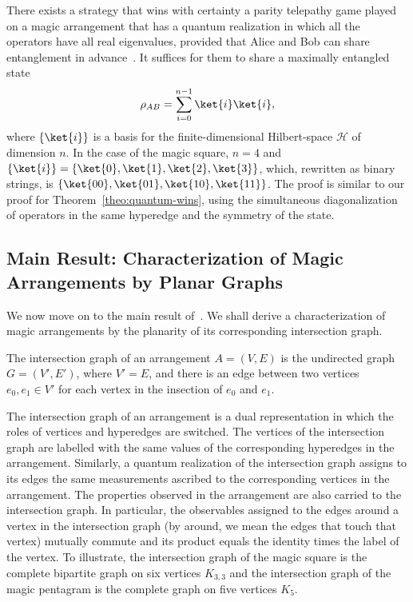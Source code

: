 \documentclass{llncs}
\begin{document}
There exists a strategy that wins with certainty a parity telepathy
game played on a magic arrangement that has a quantum realization in
which all the operators have all real eigenvalues, provided that Alice
and Bob can share entanglement in advance~\cite[Theorem
17]{arkhipov2012}. It suffices for them to share a maximally entangled
state
\[
  \rho_{AB} = \sum_{i = 0}^{n-1} \ket{i}\ket{i},
\]
where \(\{\ket{i}\}\) is a basis for the finite-dimensional
Hilbert-space \(\mathcal{H}\) of dimension \(n\). In the case of the
magic square, \(n = 4\) and
\(\{\ket{i}\} = \{\ket{0}, \ket{1}, \ket{2}, \ket{3}\}\), which,
rewritten as binary strings, is
\(\{\ket{00}, \ket{01}, \ket{10}, \ket{11}\}\). The proof is similar
to our proof for Theorem~\ref{theo:quantum-wins}, using the
simultaneous diagonalization of operators in the same hyperedge and
the symmetry of the state.

\subsection{Main Result: Characterization of Magic Arrangements by Planar Graphs}

We now move on to the main result of~\cite{arkhipov2012}. We shall
derive a characterization of magic arrangements by the planarity of
its corresponding intersection graph.

\begin{definition}\label{def:intersec}
  The intersection graph of an arrangement \(A = (V, E)\) is the
  undirected graph \(G = (V', E')\), where \(V' = E\), and there is an
  edge between two vertices \(e_{0}, e_{1} \in V'\) for each vertex in
  the insection of \(e_{0}\) and \(e_{1}\).
\end{definition}

The intersection graph of an arrangement is a dual representation in
which the roles of vertices and hyperedges are switched. The vertices
of the intersection graph are labelled with the same values of the
corresponding hyperedges in the arrangement. Similarly, a quantum
realization of the intersection graph assigns to its edges the same
measurements ascribed to the corresponding vertices in the
arrangement. The properties observed in the arrangement are also
carried to the intersection graph. In particular, the observables
assigned to the edges around a vertex in the intersection graph (by
around, we mean the edges that touch that vertex) mutually commute and
its product equals the identity times the label of the vertex. To
illustrate, the intersection graph of the magic square is the complete
bipartite graph on six vertices \(K_{3, 3}\) and the intersection
graph of the magic pentagram is the complete graph on five vertices
\(K_{5}\).
\end{document}
